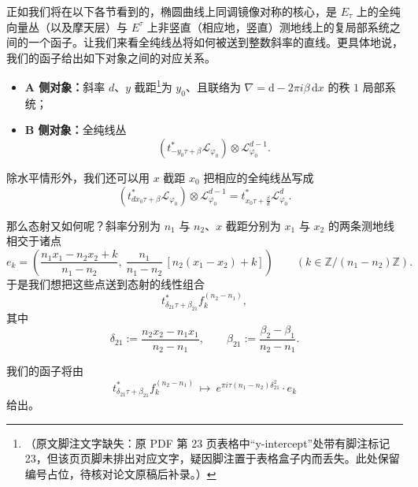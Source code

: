 \documentclass[11pt,a4paper]{article}
\theoremstyle{plain}
\theoremstyle{definition}
\begin{document}
正如我们将在以下各节看到的，椭圆曲线上同调镜像对称的核心，是 $E_\tau$ 上的全纯向量丛（以及摩天层）与 $E^\tau$ 上非竖直（相应地，竖直）测地线上的复局部系统之间的一个函子。让我们来看全纯线丛将如何被送到整数斜率的直线。更具体地说，我们的函子给出如下对象之间的对应关系。

\begin{itemize}[leftmargin=1.6em,itemsep=2pt,topsep=2pt]
  \item \textbf{A 侧对象：}斜率 $d$、$y$ 截距\footnote{（原文脚注文字缺失：原 PDF 第 23 页表格中“y-intercept”处带有脚注标记 23，但该页页脚未排出对应文字，疑因脚注置于表格盒子内而丢失。此处保留编号占位，待核对论文原稿后补录。）}为 $y_0$、且联络为 $\nabla=\mathrm{d}-2\pi i\beta\,\mathrm{d}x$ 的秩 $1$ 局部系统；
  \item \textbf{B 侧对象：}全纯线丛
  \[
    (t^*_{-y_0\tau+\beta}\mathcal{L}_{\varphi_0})\otimes\mathcal{L}_{\varphi_0}^{d-1}.
  \]
\end{itemize}


除水平情形外，我们还可以用 $x$ 截距 $x_0$ 把相应的全纯线丛写成
\[
  (t^*_{dx_0\tau+\beta}\mathcal{L}_{\varphi_0})\otimes\mathcal{L}_{\varphi_0}^{d-1}
  = t^*_{x_0\tau+\frac{\beta}{d}}\mathcal{L}_{\varphi_0}^d .
\]

那么态射又如何呢？斜率分别为 $n_1$ 与 $n_2$、$x$ 截距分别为 $x_1$ 与 $x_2$ 的两条测地线相交于诸点
\[
  e_k=\left(\frac{n_1x_1-n_2x_2+k}{n_1-n_2},\ \frac{n_1}{n_1-n_2}\,[n_2(x_1-x_2)+k]\right)
  \qquad (k\in\mathbb{Z}/(n_1-n_2)\mathbb{Z}).
\]
于是我们想把这些点送到态射的线性组合
\[
  t^*_{\delta_{21}\tau+\beta_{21}}f_k^{(n_2-n_1)},
\]
其中
\[
  \delta_{21}:=\frac{n_2x_2-n_1x_1}{n_2-n_1},
  \qquad
  \beta_{21}:=\frac{\beta_2-\beta_1}{n_2-n_1}.
\]

我们的函子将由
\[
  t^*_{\delta_{21}\tau+\beta_{21}}f_k^{(n_2-n_1)}
  \ \mapsto\ e^{\pi i\tau(n_1-n_2)\delta_{21}^2}\cdot e_k
\]
给出。
\end{document}
